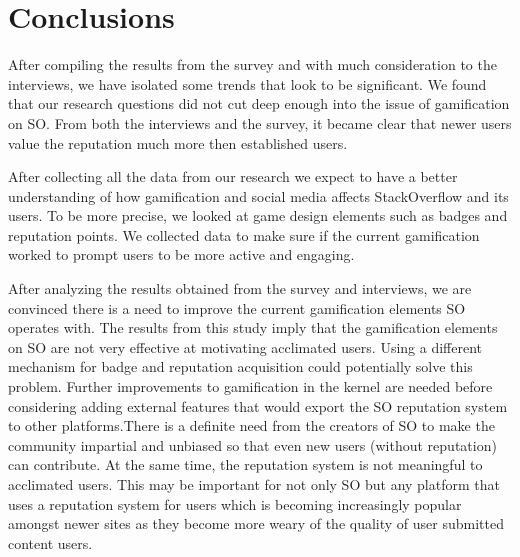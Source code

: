 \documentclass{sigchi}
\begin{document}
\section{Conclusions}

After compiling the results from the survey and with much consideration to the interviews, we have isolated some trends that look to be significant. We found that our research questions did not cut deep enough into the issue of gamification on SO. From both the interviews and the survey, it became clear that newer users value the reputation much more then established users.

After collecting all the data from our research we expect to have a better understanding of how gamification and social media affects StackOverflow and its users. To be more precise, we looked at game design elements such as badges and reputation points. We collected data to make sure if the current gamification worked to prompt users to be more active and engaging.

After analyzing the results obtained from the survey and interviews, we are convinced there is a need to improve the current gamification elements SO operates with. The results from this study imply that the gamification elements on SO are not very effective at motivating acclimated users. Using a different mechanism for badge and reputation acquisition could potentially solve this problem. Further improvements to gamification in the kernel are needed before considering adding external features that would export the SO reputation system to other platforms.There is a definite need from the creators of SO to make the community impartial and unbiased so that even new users (without reputation) can contribute. At the same time, the reputation system is not meaningful to acclimated users. This may be important for not only SO but any platform that uses a reputation system for users which is becoming increasingly popular amongst newer sites as they become more weary of the quality of user submitted content users.






% 
% 
\end{document}
